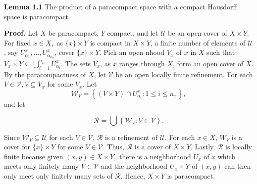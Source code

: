 \documentclass{article}
\begin{document}
\textbf{Lemma 1.1} The product of a paracompact space with a compact Hausdorff space is paracompact. 

\vskip 5pt

\textbf{Proof.} Let $X$ be paracompact, $Y$ compact, and let $\mathcal{U}$ be an open cover of $X\times Y$. For fixed $x\in X,$ as $\{x\}\times Y$ is compact in $X\times Y$, a finite number of elements of $\mathcal{U}$, say $U_{\alpha_1}^x, \dots , U_{\alpha_{n_x}}^x$, cover $\{x\}\times Y$. Pick an open nhood $V_x$ of $x$ in $X$ such that $V_x\times Y\subseteq \bigcup_{i=1}^{n_x} U_{\alpha_i}^x.$ 
\vskip 10pt
The sets $V_x$, as $x$ ranges through $X$, form an open cover of $X$. By the paracompactness of $X$, let $\mathcal{V}$ be an open locally finite refinement. For each $V\in \mathcal{V}, V\subseteq V_x$ for some $V_x$. 
Let $$\mathcal{W}_V=\left\{(V\times Y)\cap U_{\alpha_i}^x: 1\leq i\leq n_x\right\},$$ and let 

$$\mathcal{R}=\bigcup \left\{\mathcal{W}_V: V\in \mathcal{V}\right\}.$$

\vskip 5pt

Since $\mathcal{W}_V\subseteq \mathcal{U}$ for each $V\in \mathcal{V}$, $\mathcal{R}$ is a refinement of $\mathcal{U}$. For each $x\in X$, $W_V$ is a cover for $\{x\}\times Y$ for some $V\in \mathcal{V}$. Thus, $\mathcal{R}$ is a cover of $X\times Y$. Lastly, $\mathcal{R}$ is locally finite because given $(x,y)\in X\times Y,$ there is a neighborhood $U_x$ of $x$ which meets only finitely many $V\in \mathcal{V}$ and the neighborhood $U_x\times Y$ of $(x,y)$ can then only meet only finitely many sets of $\mathcal{R}$. Hence, $X\times Y$ is paracompact.
\end{document}
